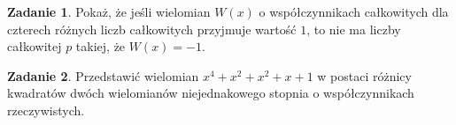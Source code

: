 \documentclass{uoom}
\theoremstyle{definition}
\newtheorem{zadd}{Zadanie}
\newenvironment{zadanie}{
  \begin{zadd}
  }
  {
    \end{zadd}\vspace{\ooodstep}
  }
\begin{document}
\begin{zadanie}
  Pokaż, że jeśli wielomian $W(x)$ o współczynnikach całkowitych dla czterech różnych liczb całkowitych przyjmuje wartość $1$, to nie ma liczby całkowitej $p$ takiej, że $W(x)=-1$.
\end{zadanie}

\begin{zadanie}
  Przedstawić wielomian $x^4+x^2+x^2+x+1$ w postaci różnicy kwadratów dwóch wielomianów niejednakowego stopnia o współczynnikach rzeczywistych.
\end{zadanie}

\end{document}
